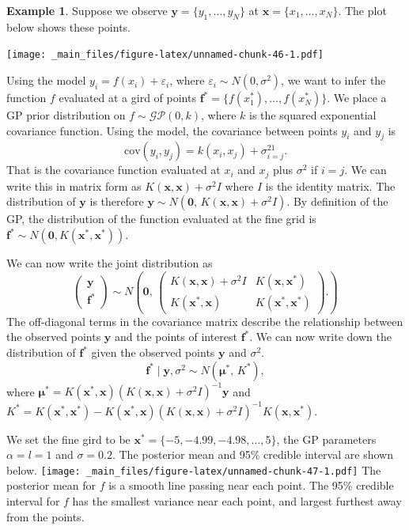 \documentclass[
]{book}
\theoremstyle{definition}
\theoremstyle{definition}
\newtheorem{example}{Example}[chapter]
\theoremstyle{definition}
\theoremstyle{definition}
\theoremstyle{remark}
\begin{document}
\begin{example}
Suppose we observe \(\boldsymbol{y} = \{y_1, \ldots, y_N\}\) at \(\boldsymbol{x} = \{x_1, \ldots, x_N\}\). The plot below shows these points.

\texttt{[image: \_main\_files/figure-latex/unnamed-chunk-46-1.pdf]}

Using the model \(y_i = f(x_i) + \varepsilon_i\), where \(\varepsilon_i \sim N(0, \sigma^2)\), we want to infer the function \(f\) evaluated at a gird of points \(\boldsymbol{f}^* = \{f(x_1^*), \ldots, f(x_N^*)\}\). We place a GP prior distribution on \(f \sim \mathcal{GP}(0, k)\), where \(k\) is the squared exponential covariance function. Using the model, the covariance between points \(y_i\) and \(y_j\) is
\[
\textrm{cov}(y_i, y_j) = k(x_i, x_j) + \sigma^21_{i=j}.
\]
That is the covariance function evaluated at \(x_i\) and \(x_j\) plus \(\sigma^2\) if \(i = j\). We can write this in matrix form as \(K(\boldsymbol{x}, \boldsymbol{x}) + \sigma^2I\) where \(I\) is the identity matrix. The distribution of \(\boldsymbol{y}\) is therefore \(\boldsymbol{y} \sim N(\boldsymbol{0}, \, K(\boldsymbol{x}, \boldsymbol{x}) + \sigma^2I)\). By definition of the GP, the distribution of the function evaluated at the fine grid is \(\boldsymbol{f}^* \sim N(\boldsymbol{0}, K(\boldsymbol{x}^*, \boldsymbol{x}^*))\).

We can now write the joint distribution as
\[
\begin{pmatrix}
\boldsymbol{y} \\
\boldsymbol{f}^*
\end{pmatrix} \sim N\left(\boldsymbol{0}, \,
\begin{pmatrix}
 K(\boldsymbol{x}, \boldsymbol{x}) + \sigma^2I &  K(\boldsymbol{x}, \boldsymbol{x}^*)\\
K(\boldsymbol{x}^*, \boldsymbol{x}) & K(\boldsymbol{x}^*, \boldsymbol{x}^*)
\end{pmatrix}.
\right)
\]
The off-diagonal terms in the covariance matrix describe the relationship between the observed points \(\boldsymbol{y}\) and the points of interest \(\boldsymbol{f}^*\). We can now write down the distribution of \(\boldsymbol{f}^*\) given the observed points \(\boldsymbol{y}\) and \(\sigma^2\).
\[
\boldsymbol{f}^* \mid \boldsymbol{y}, \sigma^2 \sim N(\boldsymbol{\mu}^*, \, K^*),
\]
where \(\boldsymbol{\mu}^* = K(\boldsymbol{x}^*, \boldsymbol{x})(K(\boldsymbol{x}, \boldsymbol{x}) + \sigma^2 I)^{-1} \boldsymbol{y}\) and \(K^* = K(\boldsymbol{x}^*, \boldsymbol{x}^*) - K(\boldsymbol{x}^*, \boldsymbol{x})(K(\boldsymbol{x}, \boldsymbol{x}) + \sigma^2I)^{-1}K(\boldsymbol{x}, \boldsymbol{x}^*)\).

We set the fine gird to be \(\boldsymbol{x}^* = \{-5, -4.99, -4.98, \ldots, 5\}\), the GP parameters \(\alpha = l = 1\) and \(\sigma = 0.2\). The posterior mean and 95\% credible interval are shown below.
\texttt{[image: \_main\_files/figure-latex/unnamed-chunk-47-1.pdf]}
The posterior mean for \(f\) is a smooth line passing near each point. The 95\% credible interval for \(f\) has the smallest variance near each point, and largest furthest away from the points.
\end{example}
\end{document}
